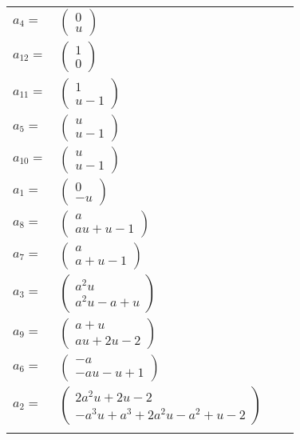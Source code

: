 \documentclass[1p]{elsarticle_modified}
\theoremstyle{definition}
\begin{document}
\begin{tabular}{m{7pt} m{180pt} m{7pt} m{180pt} }
\flushright $a_{4}=$&$\begin{pmatrix}0\\u\end{pmatrix}$ \\
\flushright $a_{12}=$&$\begin{pmatrix}1\\0\end{pmatrix}$ \\
\flushright $a_{11}=$&$\begin{pmatrix}1\\u-1\end{pmatrix}$ \\
\flushright $a_{5}=$&$\begin{pmatrix}u\\u-1\end{pmatrix}$ \\
\flushright $a_{10}=$&$\begin{pmatrix}u\\u-1\end{pmatrix}$ \\
\flushright $a_{1}=$&$\begin{pmatrix}0\\- u\end{pmatrix}$ \\
\flushright $a_{8}=$&$\begin{pmatrix}a\\a u+u-1\end{pmatrix}$ \\
\flushright $a_{7}=$&$\begin{pmatrix}a\\a+u-1\end{pmatrix}$ \\
\flushright $a_{3}=$&$\begin{pmatrix}a^2 u\\a^2 u- a+u\end{pmatrix}$ \\
\flushright $a_{9}=$&$\begin{pmatrix}a+u\\a u+2 u-2\end{pmatrix}$ \\
\flushright $a_{6}=$&$\begin{pmatrix}- a\\- a u- u+1\end{pmatrix}$ \\
\flushright $a_{2}=$&$\begin{pmatrix}2 a^2 u+2 u-2\\- a^3 u+a^3+2 a^2 u- a^2+u-2\end{pmatrix}$\\&\end{tabular}
\end{document}
